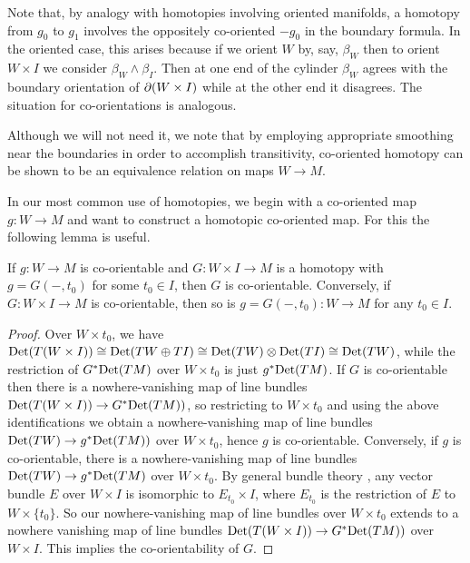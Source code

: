 Note that, by analogy with homotopies involving oriented manifolds, a homotopy from $g_0$ to $g_1$ involves the oppositely co-oriented $-g_0$ in the boundary formula.
In the oriented case, this arises because if we orient $W$ by, say, $\beta_W$ then to orient $W \times I$ we consider $\beta_W \wedge \beta_I$.
Then at one end of the cylinder $\beta_W$ agrees with the boundary orientation of $\partial (W \times I)$ while at the other end it disagrees.
The situation for co-orientations is analogous.

Although we will not need it, we note that by employing appropriate smoothing near the boundaries in order to accomplish transitivity, co-oriented homotopy can be shown to be an equivalence relation on maps $W \to M$.

In our most common use of homotopies, we begin with a co-oriented map $g \colon W \to M$ and want to construct a homotopic co-oriented map.
For this the following lemma is useful.

\begin{lemma}\label{L: co-orientable homotopies}
	If $g \colon W \to M$ is co-orientable and $G \colon W \times I \to M$ is a homotopy with $g = G(-,t_0)$ for some $t_0 \in I$, then $G$ is co-orientable.
	Conversely, if $G \colon W \times I \to M$ is co-orientable, then so is $g = G(-,t_0) \colon W \to M$ for any $t_0 \in I$.
\end{lemma}

\begin{proof}
	Over $W \times t_0$, we have ${\rm Det}(T(W \times I)) \cong {\rm Det}(TW \oplus TI) \cong {\rm Det}(TW) \otimes {\rm Det} (TI) \cong {\rm Det}(TW)$, while the restriction of $G^*{\rm Det}(TM)$ over $W \times t_0$ is just $g^*{\rm Det}(TM)$.
	If $G$ is co-orientable then there is a nowhere-vanishing map of line bundles ${\rm Det}(T(W \times I)) \to G^*{\rm Det}(TM))$, so restricting to $W \times t_0$ and using the above identifications we obtain a nowhere-vanishing map of line bundles ${\rm Det}(TW) \to g^*{\rm Det}(TM))$ over $W \times t_0$, hence $g$ is co-orientable.
	Conversely,
	if $g$ is co-orientable, there is a nowhere-vanishing map of line bundles ${\rm Det}(TW) \to g^*{\rm Det}(TM)$ over $W \times t_0$.
	By general bundle theory \cite[Theorem 3.4.4]{Hus94}, any vector bundle $E$ over $W \times I$ is isomorphic to $E_{t_0} \times I$, where $E_{t_0}$ is the restriction of $E$ to $W \times \{t_0\}$.
	So our nowhere-vanishing map of line bundles over $W \times t_0$ extends to a nowhere vanishing map of line bundles ${\rm Det}(T(W \times I)) \to G^*{\rm Det}(TM))$ over $W \times I$.
	This implies the co-orientability of $G$.
\end{proof}

